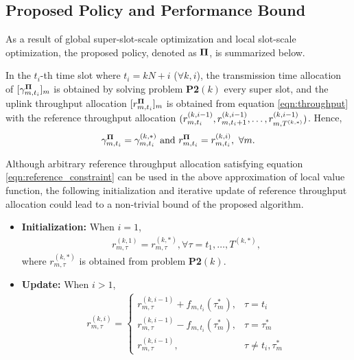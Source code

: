 \subsection{Proposed Policy and Performance Bound}
As a result of global super-slot-scale optimization and local slot-scale optimization, the proposed policy, denoted as $\mathbf{\Pi}$, is summarized below.
\begin{definition}
    \label{def:baseline}
    In the $t_i$-th time slot where $t_i=kN+i$ ($\forall k,i$),
    the transmission time allocation of {\IAVs} $[ \gamma^{\mathbf{\Pi}}_{m,t_i}]_m$ is obtained by solving problem \textbf{P2$(k)$} every super slot, and the uplink throughput allocation $[ r^{\mathbf{\Pi}}_{m,t_i}]_m$ is obtained from equation \eqref{eqn:throughput} with the reference throughput allocation
    $( r^{(k,i-1)}_{m,t_i}, r^{(k,i-1)}_{m,t_i+1}, \dots, r^{(k,i-1)}_{m,T^{(k,*)}} )$.
    Hence,  $$\gamma^{\mathbf{\Pi}}_{m,t_i}=\gamma^{(k,*)}_{m,t_i} \mbox{ and } r^{\mathbf{\Pi}}_{m,t_i} = r^{(k,i)}_{m,t_i}, \ \forall m.$$
\end{definition}

Although arbitrary reference throughput allocation satisfying equation \eqref{eqn:reference_constraint} can be used in the above approximation of local value function, the following initialization and iterative update of reference throughput allocation could lead to a non-trivial bound of the proposed algorithm. 
\begin{itemize}
    \item {\bf Initialization:} When $i=1$, 
    \begin{align}
        r^{(k,1)}_{m,\tau} = r^{(k,*)}_{m,\tau}, \forall \tau = t_{1}, \dots, T^{(k,*)}\nonumber,
    \end{align}
    where $r^{(k,*)}_{m,\tau}$ is obtained from problem {\bf P2}$(k)$.
    \item {\bf Update:} When $i>1$,
    \begin{align}
    r^{(k,i)}_{m,\tau} = 
    \begin{cases}
        r^{(k,i-1)}_{m,\tau} + f_{m,t_{i}}(\tau_m^*), &\tau=t_i
        \\
        r^{(k,i-1)}_{m,\tau} - f_{m,t_{i}}(\tau_m^*), &\tau=\tau^*_{m}
        \\
        r^{(k,i-1)}_{m,\tau}, &\tau \neq t_i, \tau^*_{m}
    \end{cases}
    \label{eqn:approx_solution}
\end{align}
\end{itemize}

